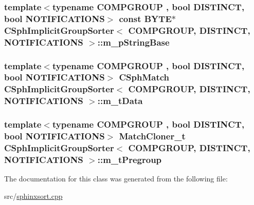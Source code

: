 \hypertarget{classCSphImplicitGroupSorter_a496d3aad55066ee694ec4dd17508e608}{
\subsubsection[{m\-\_\-p\-String\-Base}]{\setlength{\rightskip}{0pt plus 5cm}template$<$typename C\-O\-M\-P\-G\-R\-O\-U\-P , bool D\-I\-S\-T\-I\-N\-C\-T, bool N\-O\-T\-I\-F\-I\-C\-A\-T\-I\-O\-N\-S$>$ const {\bf B\-Y\-T\-E}$\ast$ {\bf C\-Sph\-Implicit\-Group\-Sorter}$<$ C\-O\-M\-P\-G\-R\-O\-U\-P, D\-I\-S\-T\-I\-N\-C\-T, N\-O\-T\-I\-F\-I\-C\-A\-T\-I\-O\-N\-S $>$\-::m\-\_\-p\-String\-Base\hspace{0.3cm}{\ttfamily [protected]}}}\label{classCSphImplicitGroupSorter_a496d3aad55066ee694ec4dd17508e608}
\hypertarget{classCSphImplicitGroupSorter_aefb0a158f4108e85763c58290536305a}{
\subsubsection[{m\-\_\-t\-Data}]{\setlength{\rightskip}{0pt plus 5cm}template$<$typename C\-O\-M\-P\-G\-R\-O\-U\-P , bool D\-I\-S\-T\-I\-N\-C\-T, bool N\-O\-T\-I\-F\-I\-C\-A\-T\-I\-O\-N\-S$>$ {\bf C\-Sph\-Match} {\bf C\-Sph\-Implicit\-Group\-Sorter}$<$ C\-O\-M\-P\-G\-R\-O\-U\-P, D\-I\-S\-T\-I\-N\-C\-T, N\-O\-T\-I\-F\-I\-C\-A\-T\-I\-O\-N\-S $>$\-::m\-\_\-t\-Data\hspace{0.3cm}{\ttfamily [protected]}}}\label{classCSphImplicitGroupSorter_aefb0a158f4108e85763c58290536305a}
\hypertarget{classCSphImplicitGroupSorter_ac201dd39488fb2367b54bf390f495085}{
\subsubsection[{m\-\_\-t\-Pregroup}]{\setlength{\rightskip}{0pt plus 5cm}template$<$typename C\-O\-M\-P\-G\-R\-O\-U\-P , bool D\-I\-S\-T\-I\-N\-C\-T, bool N\-O\-T\-I\-F\-I\-C\-A\-T\-I\-O\-N\-S$>$ {\bf Match\-Cloner\-\_\-t} {\bf C\-Sph\-Implicit\-Group\-Sorter}$<$ C\-O\-M\-P\-G\-R\-O\-U\-P, D\-I\-S\-T\-I\-N\-C\-T, N\-O\-T\-I\-F\-I\-C\-A\-T\-I\-O\-N\-S $>$\-::m\-\_\-t\-Pregroup\hspace{0.3cm}{\ttfamily [protected]}}}\label{classCSphImplicitGroupSorter_ac201dd39488fb2367b54bf390f495085}


The documentation for this class was generated from the following file\-:\begin{DoxyCompactItemize}
\item 
src/\hyperlink{sphinxsort_8cpp}{sphinxsort.\-cpp}\end{DoxyCompactItemize}
